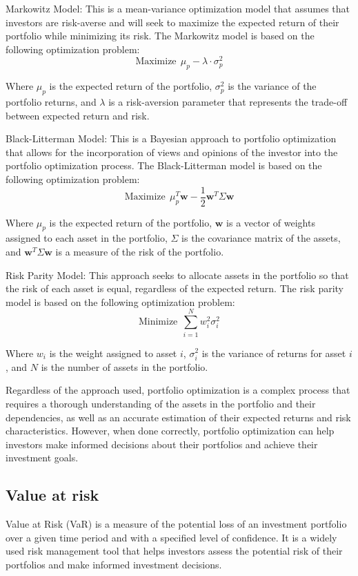 \documentclass[12pt, a4paper, oneside]{article}
\begin{document}
Markowitz Model: This is a mean-variance optimization model that assumes that investors are risk-averse and will seek to maximize the expected return of their portfolio while minimizing its risk. The Markowitz model is based on the following optimization problem:
$$\text{Maximize} \ \ \mu_p - \lambda \cdot \sigma_p^2$$

Where $\mu_p$ is the expected return of the portfolio, $\sigma_p^2$ is the variance of the portfolio returns, and $\lambda$ is a risk-aversion parameter that represents the trade-off between expected return and risk.

Black-Litterman Model: This is a Bayesian approach to portfolio optimization that allows for the incorporation of views and opinions of the investor into the portfolio optimization process. The Black-Litterman model is based on the following optimization problem:
$$\text{Maximize} \ \ \mu_p^T\mathbf{w} - \frac{1}{2} \mathbf{w}^T \Sigma \mathbf{w}$$

Where $\mu_p$ is the expected return of the portfolio, $\mathbf{w}$ is a vector of weights assigned to each asset in the portfolio, $\Sigma$ is the covariance matrix of the assets, and $\mathbf{w}^T \Sigma \mathbf{w}$ is a measure of the risk of the portfolio.

Risk Parity Model: This approach seeks to allocate assets in the portfolio so that the risk of each asset is equal, regardless of the expected return. The risk parity model is based on the following optimization problem:
$$\text{Minimize} \ \ \sum_{i=1}^{N} w_i^2 \sigma_i^2$$

Where $w_i$ is the weight assigned to asset $i$, $\sigma_i^2$ is the variance of returns for asset $i$, and $N$ is the number of assets in the portfolio.

Regardless of the approach used, portfolio optimization is a complex process that requires a thorough understanding of the assets in the portfolio and their dependencies, as well as an accurate estimation of their expected returns and risk characteristics. However, when done correctly, portfolio optimization can help investors make informed decisions about their portfolios and achieve their investment goals.
\subsection{ Value at risk }
Value at Risk (VaR) is a measure of the potential loss of an investment portfolio over a given time period and with a specified level of confidence. It is a widely used risk management tool that helps investors assess the potential risk of their portfolios and make informed investment decisions.
\end{document}

